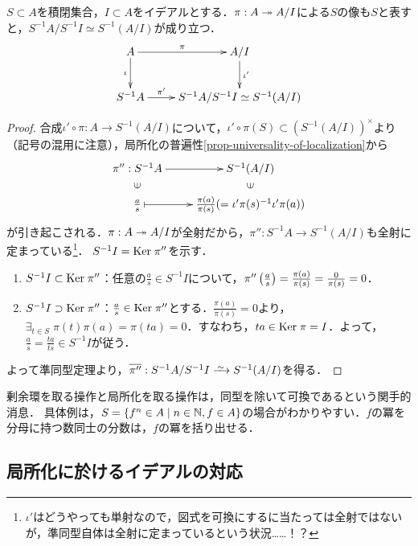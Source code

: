 \documentclass[uplatex,dvipdfmx]{jsreport}
\begin{document}
\begin{proposition}[局所化と剰余環の関係]\label{prop-isomorphism-between-localizaion-and-quotient}
    $S\subset A$を積閉集合，$I\subset A$をイデアルとする．$\pi:A\twoheadrightarrow A/I$による$S$の像も$S$と表すと，$S^{-1}A/S^{-1}I\simeq S^{-1}(A/I)$が成り立つ．
    \[\xymatrix{
        A\ar[r]^-\pi\ar[d]_-\iota&A/I\ar[d]^-{\iota'}\\
        S^{-1}A\ar[r]^-{\pi'}&S^{-1}A/S^{-1}I\simeq S^{-1}(A/I)
    }\]
\end{proposition}
\begin{proof}
    合成$\iota'\circ\pi:A\to S^{-1}(A/I)$について，$\iota'\circ\pi(S)\subset(S^{-1}(A/I))^\times$より（記号の混用に注意），局所化の普遍性\ref{prop-universality-of-localization}から
    \[\xymatrix@R-2pc{
        \pi'':S^{-1}A\ar[r]&S^{-1}(A/I)\\
        \rotatebox[origin=c]{90}{$\in$}&\rotatebox[origin=c]{90}{$\in$}\\
        \frac{a}{s}\ar@{|->}[r]&\frac{\pi(a)}{\pi(s)}(=\iota'\pi(s)^{-1}\iota'\pi(a))
    }\]
    が引き起こされる．$\pi:A\twoheadrightarrow A/I$が全射だから，$\pi'':S^{-1}A\to S^{-1}(A/I)$も全射に定まっている\footnote{$\iota'$はどうやっても単射なので，図式を可換にするに当たっては全射ではないが，準同型自体は全射に定まっているという状況……！？}．
    $S^{-1}I=\mathrm{Ker}\;\pi''$を示す．
    \begin{enumerate}
        \item $S^{-1}I\subset\mathrm{Ker}\;\pi''$：任意の$\frac{a}{s}\in S^{-1}I$について，$\pi''\left(\frac{a}{s}\right)=\frac{\pi(a)}{\pi(s)}=\frac{0}{\pi(s)}=0$．
        \item $S^{-1}I\supset\mathrm{Ker}\;\pi''$：$\frac{a}{s}\in\mathrm{Ker}\;\pi''$とする．$\frac{\pi(a)}{\pi(s)}=0$より，$\exists_{t\in S}\;\pi(t)\pi(a)=\pi(ta)=0$．すなわち，$ta\in\mathrm{Ker}\;\pi=I$．よって，$\frac{a}{s}=\frac{ta}{ts}\in S^{-1}I$が従う．
    \end{enumerate}
    よって準同型定理より，$\o{\pi''}:S^{-1}A/S^{-1}I\iso S^{-1}(A/I)$を得る．
\end{proof}
\begin{remarks}
    剰余環を取る操作と局所化を取る操作は，同型を除いて可換であるという関手的消息．
    具体例は，$S=\left\{f^n\in A\mid n\in\mathbb{N},f\in A\right\}$の場合がわかりやすい．$f$の冪を分母に持つ数同士の分数は，$f$の冪を括り出せる．
\end{remarks}

\subsection{局所化に於けるイデアルの対応}
\end{document}
